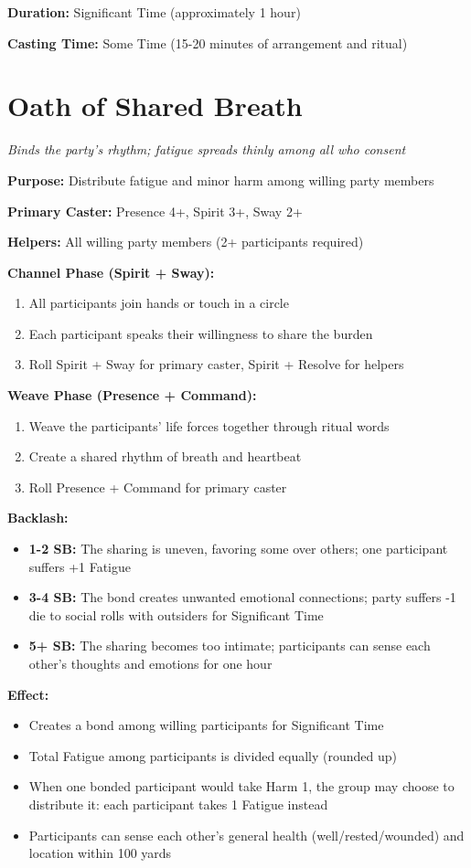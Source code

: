 \textbf{Duration:} Significant Time (approximately 1 hour)

\textbf{Casting Time:} Some Time (15-20 minutes of arrangement and ritual)

\section*{Oath of Shared Breath}
\textit{Binds the party's rhythm; fatigue spreads thinly among all who consent}

\textbf{Purpose:} Distribute fatigue and minor harm among willing party members

\textbf{Primary Caster:} Presence 4+, Spirit 3+, Sway 2+

\textbf{Helpers:} All willing party members (2+ participants required)

\textbf{Channel Phase (Spirit + Sway):}
\begin{enumerate}
\item All participants join hands or touch in a circle
\item Each participant speaks their willingness to share the burden
\item Roll Spirit + Sway for primary caster, Spirit + Resolve for helpers
\end{enumerate}

\textbf{Weave Phase (Presence + Command):}
\begin{enumerate}
\item Weave the participants' life forces together through ritual words
\item Create a shared rhythm of breath and heartbeat
\item Roll Presence + Command for primary caster
\end{enumerate}

\textbf{Backlash:}
\begin{itemize}
\item \textbf{1-2 SB:} The sharing is uneven, favoring some over others; one participant suffers +1 Fatigue
\item \textbf{3-4 SB:} The bond creates unwanted emotional connections; party suffers -1 die to social rolls with outsiders for Significant Time
\item \textbf{5+ SB:} The sharing becomes too intimate; participants can sense each other's thoughts and emotions for one hour
\end{itemize}

\textbf{Effect:}
\begin{itemize}
\item Creates a bond among willing participants for Significant Time
\item Total Fatigue among participants is divided equally (rounded up)
\item When one bonded participant would take Harm 1, the group may choose to distribute it: each participant takes 1 Fatigue instead
\item Participants can sense each other's general health (well/rested/wounded) and location within 100 yards
\end{itemize}


